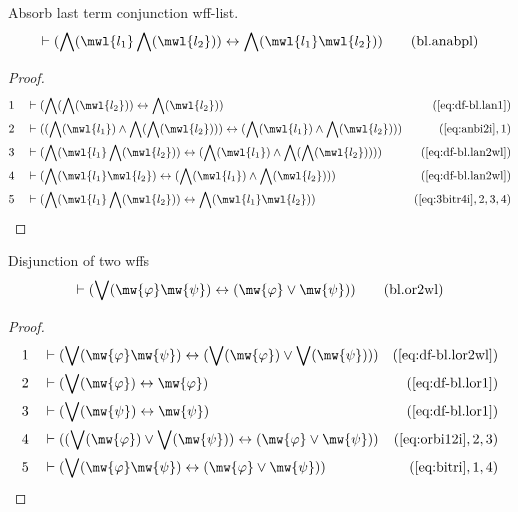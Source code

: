 \begin{lemma} Absorb last term conjunction wff-list.
\begin{align}
\vdash ( \bigwedge( \mwl{l_1} \bigwedge( \mwl{l_2} ) ) \leftrightarrow
    \bigwedge( \mwl{l_1} \mwl{l_2} ) )\label{eq:bl.anabpl}\tag{bl.anabpl}
\end{align}
\end{lemma}

\begin{proof}
\begin{align}
  1 &&  & \vdash ( \bigwedge( \bigwedge( \mwl{l_2} ) ) \leftrightarrow \bigwedge( \mwl{l_2} ) )&(\mbox{\ref{eq:df-bl.lan1}})\notag
  \\ 2 &&  & \vdash ( ( \bigwedge( \mwl{l_1} ) \wedge \bigwedge( \bigwedge( \mwl{l_2} ) ) ) \leftrightarrow ( \bigwedge( \mwl{l_1} ) \wedge \bigwedge( \mwl{l_2} ) ) )&(\mbox{\ref{eq:anbi2i}},1)\notag
  \\ 3 &&  & \vdash ( \bigwedge( \mwl{l_1} \bigwedge( \mwl{l_2} ) ) \leftrightarrow ( \bigwedge( \mwl{l_1} ) \wedge \bigwedge( \bigwedge( \mwl{l_2} ) ) ) )&(\mbox{\ref{eq:df-bl.lan2wl}})\notag
  \\ 4 &&  & \vdash ( \bigwedge( \mwl{l_1} \mwl{l_2} ) \leftrightarrow ( \bigwedge( \mwl{l_1} ) \wedge \bigwedge( \mwl{l_2} ) ) )&(\mbox{\ref{eq:df-bl.lan2wl}})\notag
  \\ 5 &&  & \vdash ( \bigwedge( \mwl{l_1} \bigwedge( \mwl{l_2} ) ) \leftrightarrow \bigwedge( \mwl{l_1} \mwl{l_2} ) )&(\mbox{\ref{eq:3bitr4i}},2,3,4)\notag
\end{align}
\end{proof}

\begin{lemma} Disjunction of two wffs
\begin{align}
\vdash ( \bigvee( \mw{\varphi} \mw{\psi} ) \leftrightarrow ( \mw{\varphi} \vee
    \mw{\psi} ) )\label{eq:bl.or2wl}\tag{bl.or2wl}
\end{align}
\end{lemma}

\begin{proof}
\begin{align}
  1 &&  & \vdash ( \bigvee( \mw{\varphi} \mw{\psi} ) \leftrightarrow ( \bigvee( \mw{\varphi} ) \vee \bigvee( \mw{\psi} ) ) )&(\mbox{\ref{eq:df-bl.lor2wl}})\notag
  \\ 2 &&  & \vdash ( \bigvee( \mw{\varphi} ) \leftrightarrow \mw{\varphi} )&(\mbox{\ref{eq:df-bl.lor1}})\notag
  \\ 3 &&  & \vdash ( \bigvee( \mw{\psi} ) \leftrightarrow \mw{\psi} )&(\mbox{\ref{eq:df-bl.lor1}})\notag
  \\ 4 &&  & \vdash ( ( \bigvee( \mw{\varphi} ) \vee \bigvee( \mw{\psi} ) ) \leftrightarrow ( \mw{\varphi} \vee \mw{\psi} ) )&(\mbox{\ref{eq:orbi12i}},2,3)\notag
  \\ 5 &&  & \vdash ( \bigvee( \mw{\varphi} \mw{\psi} ) \leftrightarrow ( \mw{\varphi} \vee \mw{\psi} ) )&(\mbox{\ref{eq:bitri}},1,4)\notag
\end{align}
\end{proof}

